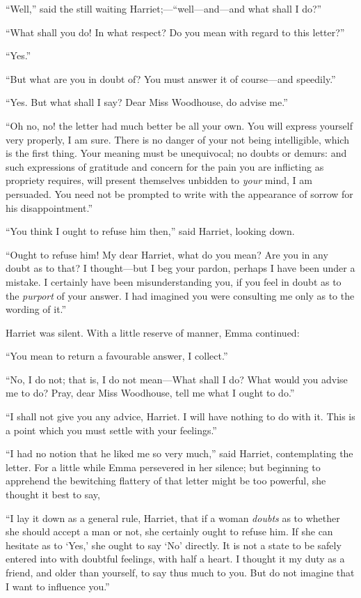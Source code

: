 ``Well,'' said the still waiting Harriet;---``well---and---and what
shall I do?''

``What shall you do! In what respect? Do you mean with regard
to this letter?''

``Yes.''

``But what are you in doubt of? You must answer it of course---and speedily.''

``Yes. But what shall I say? Dear Miss Woodhouse, do advise me.''

``Oh no, no! the letter had much better be all your own.  You will
express yourself very properly, I am sure.  There is no danger of your
not being intelligible, which is the first thing.  Your meaning must
be unequivocal; no doubts or demurs: and such expressions of gratitude
and concern for the pain you are inflicting as propriety requires,
will present themselves unbidden to \emph{your} mind, I am persuaded.
You need not be prompted to write with the appearance of sorrow
for his disappointment.''

``You think I ought to refuse him then,'' said Harriet, looking down.

``Ought to refuse him! My dear Harriet, what do you mean? Are you
in any doubt as to that? I thought---but I beg your pardon, perhaps I
have been under a mistake.  I certainly have been misunderstanding
you, if you feel in doubt as to the \emph{purport} of your answer.
I had imagined you were consulting me only as to the wording of it.''

Harriet was silent.  With a little reserve of manner, Emma continued:

``You mean to return a favourable answer, I collect.''

``No, I do not; that is, I do not mean---What shall I do? What would
you advise me to do? Pray, dear Miss Woodhouse, tell me what I
ought to do.''

``I shall not give you any advice, Harriet.  I will have nothing to
do with it.  This is a point which you must settle with your feelings.''

``I had no notion that he liked me so very much,'' said Harriet,
contemplating the letter.  For a little while Emma persevered
in her silence; but beginning to apprehend the bewitching flattery
of that letter might be too powerful, she thought it best to say,

``I lay it down as a general rule, Harriet, that if a woman \emph{doubts}
as to whether she should accept a man or not, she certainly ought
to refuse him.  If she can hesitate as to `Yes,' she ought to say
`No' directly.  It is not a state to be safely entered into
with doubtful feelings, with half a heart.  I thought it my duty
as a friend, and older than yourself, to say thus much to you.
But do not imagine that I want to influence you.''

